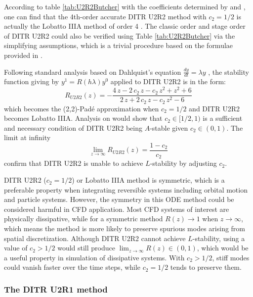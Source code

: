 According to table \ref{tab:U2R2Butcher} with the coefficients
determined by  and ,
one can find that the 4th-order accurate
DITR U2R2 method with $c_2=1/2$
is actually the Lobatto IIIA method
of order 4 \cite{wanner1996solving}.
The classic order and stage order of DITR U2R2 could
also be verified using Table \ref{tab:U2R2Butcher} via
the simplifying assumptions, which is a trivial procedure
based on the formulae provided in \cite{wanner1996solving}.

Following standard analysis based on Dahlquist's equation
$\frac{dy}{dt} = \lambda y$ \cite{wanner1996solving},
the stability function giving by $y^{1}=R(h\lambda)y^0$
applied to DITR U2R2 is in the form:
\begin{equation}
    \label{eq:stabilityFuncU2R2}
    R_{U2R2}(z) = -\frac{4\,z-2\,c_{2}\,z-c_{2}\,z^2+z^2+6}{2\,z+2\,c_{2}\,z-c_{2}\,z^2-6}
\end{equation}
which becomes the (2,2)-Pad{\'e} approximation when $c_2=1/2$ and
DITR U2R2 becomes Lobatto IIIA.
Analysis on 
would show that $c_2\in[1/2,1)$ is a sufficient and necessary
condition of DITR U2R2 being $A$-stable given $c_2\in(0,1)$.
The limit at infinity
\begin{equation}
    \lim_{z\rightarrow\infty}R_{U2R2}(z) = \frac{1-c_2}{c_2}
\end{equation}
confirm that DITR U2R2 is unable to achieve $L$-stability
by adjusting $c_2$.


DITR U2R2 ($c_2=1/2$) or Lobatto IIIA method is symmetric,
which is a preferable property when integrating
reversible systems including orbital motion and particle
systems.
However,
the symmetry in this ODE method could be considered harmful in CFD application.
Most CFD systems of interest are physically dissipative,
while for a symmetric method
$R(z) \rightarrow 1$ when $z \rightarrow \infty$,
which means the method is more likely to preserve
spurious modes arising from spatial discretization.
Although DITR U2R2 cannot achieve $L$-stability,
using a value of $c_2 > 1/2$ would still
produce $\lim_{z\rightarrow\infty}R(z)\in(0,1)$, which
would be a useful property in simulation of dissipative systems.
With  $c_2 > 1/2$, stiff modes could vanish faster over the time
steps, while $c_2 = 1/2$ tends to preserve them.

\subsubsection{The DITR U2R1 method}

